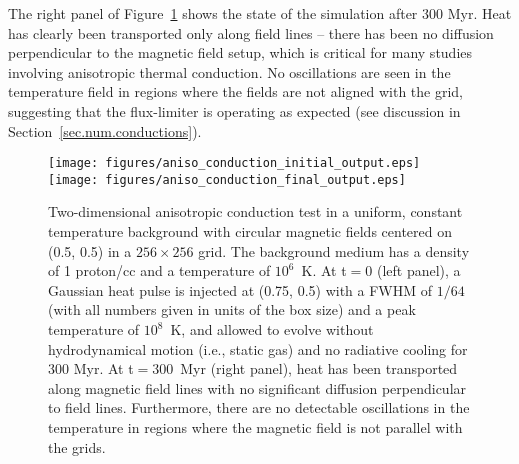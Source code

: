 The right panel of Figure~\ref{fig.conduct} shows the state of the
simulation after 300 Myr.  Heat has clearly been transported only
along field lines -- there has been no diffusion perpendicular to the
magnetic field setup, which is critical for many studies involving
anisotropic thermal conduction.  No oscillations are seen in the
temperature field in regions where the fields are not aligned with the
grid, suggesting that the flux-limiter is operating as expected (see
discussion in Section~\ref{sec.num.conductions}).

\begin{figure}
\begin{center}
\texttt{[image: figures/aniso\_conduction\_initial\_output.eps]}
\texttt{[image: figures/aniso\_conduction\_final\_output.eps]}
\caption{Two-dimensional anisotropic conduction test in a uniform,
constant temperature background with circular magnetic fields centered
on (0.5, 0.5) in a $256 \times 256$ grid.  The background medium has a density of 1
proton/cc and a temperature of $10^6$~K.  At t$ = 0$ (left panel), a
Gaussian heat pulse is injected at (0.75, 0.5) with a FWHM of $1/64$
(with all numbers given in units of the box size) and a peak
temperature of $10^8$~K, and allowed to evolve without hydrodynamical
motion (i.e., static gas) and no radiative cooling for 300 Myr.  At t$
= 300$~Myr (right panel), heat has been transported along magnetic
field lines with no significant diffusion perpendicular to field
lines. Furthermore, there are no detectable oscillations in the
temperature in regions where the magnetic field is not parallel with
the grids.}
\label{fig.conduct}
\end{center}
\end{figure}
